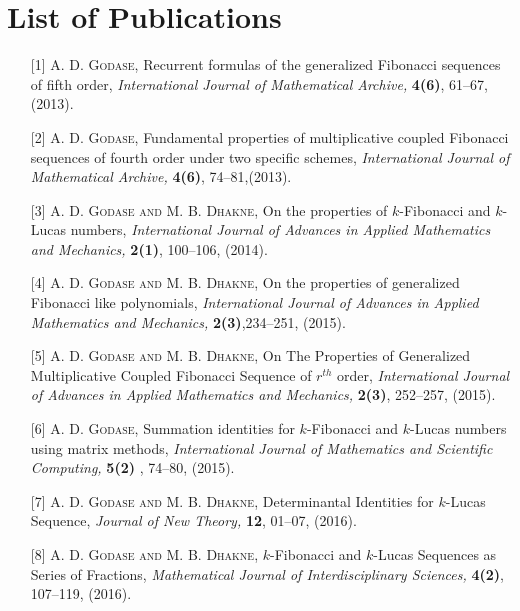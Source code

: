 %
%
\let\textcircled=\pgftextcircled
\chapter{List of Publications}
\label{chap:List of Publications}

\begin{footnotesize}
\begin{itemize}  
\item[{[1]}] \textsc{A. D. Godase,} Recurrent formulas of the generalized Fibonacci sequences of fifth order, {\it International Journal of Mathematical Archive,} {\bf 4(6)},  61--67, (2013).

\item[{[2]}]\textsc{A. D. Godase}, Fundamental properties of multiplicative coupled Fibonacci sequences of fourth order under two specific schemes, {\it International Journal of Mathematical Archive,} {\bf 4(6)}, 74--81,(2013).

\item[{[3]}] \textsc{A. D. Godase and M. B. Dhakne,} On the properties of $k$-Fibonacci and $k$-Lucas numbers, {\it International Journal of Advances in Applied Mathematics and Mechanics,} {\bf 2(1)}, 100--106, (2014).
  
\item[{[4]}] \textsc{A. D. Godase and M. B. Dhakne,} On the properties of generalized Fibonacci like polynomials, {\it International Journal of Advances in Applied Mathematics and Mechanics,} {\bf 2(3)},234--251, (2015).

\item[{[5]}] \textsc{A. D. Godase and M. B. Dhakne,} On The Properties of Generalized Multiplicative Coupled Fibonacci Sequence of $r^{th}$ order, {\it International Journal of Advances in Applied Mathematics and Mechanics,} {\bf 2(3)}, 252--257, (2015).

\item[{[6]}]\textsc{A. D. Godase}, Summation identities for $k$-Fibonacci and $k$-Lucas numbers using matrix methods, {\it International Journal of Mathematics and Scientific Computing,} {\bf 5(2) }, 74--80, (2015).

\item[{[7]}] \textsc{A. D. Godase and M. B. Dhakne,} Determinantal Identities for $k$-Lucas Sequence, {\it Journal of New Theory,} {\bf 12}, 01--07, (2016).

\item[{[8]}] \textsc{A. D. Godase and M. B. Dhakne,} $k$-Fibonacci and $k$-Lucas Sequences as Series of Fractions, {\it Mathematical Journal of Interdisciplinary Sciences,} {\bf 4(2)}, 107--119, (2016).


\end{itemize}
\end{footnotesize}

